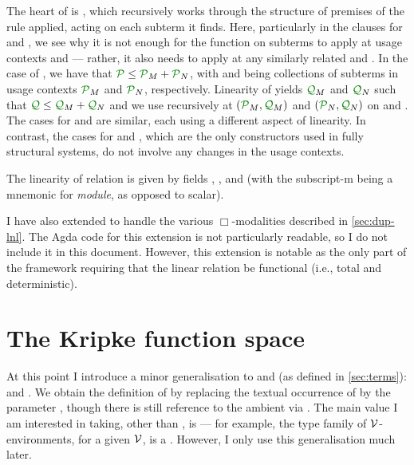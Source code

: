 The heart of  is , which recursively
works through the structure  of premises of the rule applied,
acting on each subterm it finds.
Here, particularly in the clauses for  and
, we see why it is not enough for the
function on subterms to apply at usage contexts  and 
--- rather, it also needs to apply at any similarly related 
and .
In the case of , we have that
$\grP \leq \grP_M + \grP_N$, with  and  being
collections of subterms in usage contexts $\grP_M$ and $\grP_N$, respectively.
Linearity of \AgdaBound{$\Psi$} yields $\grQ_M$ and $\grQ_N$ such that
$\grQ \leq \grQ_M + \grQ_N$ and we use  recursively at
$(\grP_M, \grQ_M)$ and $(\grP_N, \grQ_N)$ on  and .
The cases for  and
 are similar, each using a different aspect
of linearity.
In contrast, the cases for  and
, which are the only constructors used in fully structural
systems, do not involve any changes in the usage contexts.

The linearity of relation \AgdaBound{$\Psi$} is given by fields
, , and  (with
the subscript-m being a mnemonic for \emph{module}, as opposed to scalar).


I have also extended  to handle the various
$\Box$-modalities described in \cref{sec:dup-lnl}.
The Agda code for this extension is not particularly readable, so I do not
include it in this document.
However, this extension is notable as the only part of the framework requiring
that the linear relation \AgdaBound{$\Psi$} be functional (i.e., total and
deterministic).

\section{The Kripke function space}\label{sec:kripke}

At this point I introduce a minor generalisation to
 and  (as defined in
\cref{sec:terms}):
\AgdaSpace{} and
\AgdaSpace{}.  We obtain the
definition of \AgdaSpace{} by
replacing the textual occurrence of  by the parameter
, though there is still reference to the ambient 
via .
The main value I am interested in  taking, other than
, is  --- for example, the type family of
$\mathcal V$-environments, for a given $\mathcal V$, is a
\AgdaSpace{}%
\AgdaSpace{}\AgdaSymbol{\_}.
However, I only use this generalisation much later.

